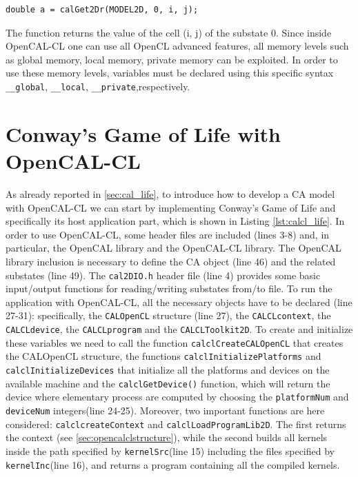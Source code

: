 \begin{lstlisting}[numbers=none] 
	double a = calGet2Dr(MODEL2D, 0, i, j);
\end{lstlisting}

The function returns the value of the cell (i, j) of the substate
0. Since inside OpenCAL-CL one can use all OpenCL advanced features, all
memory levels such as global memory, local memory, private memory
can be exploited. In order to use these memory
levels, variables must be declared using this specific syntax
\verb'__global', \verb'__local', \verb'__private',respectively.

\section{Conway's Game of Life with OpenCAL-CL}
 
As already reported in \ref{sec:cal_life}, to introduce how to develop
a CA model with OpenCAL-CL we can start by implementing Conway’s Game
of Life and specifically its host application part, which is shown in
Listing \ref{lst:calcl_life}. In order to use OpenCAL-CL, some header
files are included (lines 3-8) and, in particular, the OpenCAL library
and the OpenCAL-CL library. The OpenCAL library inclusion is necessary
to define the CA object (line 46) and the related substates (line
49). The \verb'cal2DIO.h' header file (line 4) provides some basic
input/output functions for reading/writing substates from/to file. To
run the application with OpenCAL-CL, all the necessary objects have to
be declared (line 27-31): specifically, the \verb'CALOpenCL' structure
(line 27), the \verb'CALCLcontext', the \verb'CALCLdevice', the
\verb'CALCLprogram' and the \verb'CALCLToolkit2D'. To create and
initialize these variables we need to call the function
\verb'calclCreateCALOpenCL' that creates the CALOpenCL structure, the
functions \verb|calclInitializePlatforms| and
\verb|calclInitializeDevices| that initialize all the platforms and
devices on the available machine and the \verb'calclGetDevice()'
function, which will return the device where elementary process are
computed by choosing the \verb'platformNum' and \verb'deviceNum'
integers(line 24-25). Moreover, two important functions are here
considered: \verb'calclcreateContext' and
\verb'calclLoadProgramLib2D'. The first returns the context
(see \ref{sec:opencalclstructure}), while the second builds all kernels inside
the path specified by \verb'kernelSrc'(line 15) including the files
specified by \verb'kernelInc'(line 16), and returns a program
containing all the compiled kernels.

